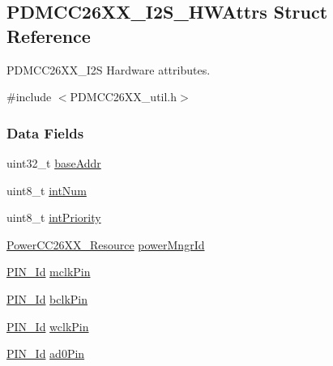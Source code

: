 \subsection{P\+D\+M\+C\+C26\+X\+X\+\_\+\+I2\+S\+\_\+\+H\+W\+Attrs Struct Reference}
\label{struct_p_d_m_c_c26_x_x___i2_s___h_w_attrs}


P\+D\+M\+C\+C26\+X\+X\+\_\+\+I2\+S Hardware attributes.  




{\ttfamily \#include $<$P\+D\+M\+C\+C26\+X\+X\+\_\+util.\+h$>$}

\subsubsection*{Data Fields}
\begin{DoxyCompactItemize}
\item 
uint32\+\_\+t \hyperlink{struct_p_d_m_c_c26_x_x___i2_s___h_w_attrs_af1366b2ec99c0c4b6f99a4f35eb0b1f5}{base\+Addr}
\item 
uint8\+\_\+t \hyperlink{struct_p_d_m_c_c26_x_x___i2_s___h_w_attrs_acaa31ac5c7fdd2274bc81f4aba780301}{int\+Num}
\item 
uint8\+\_\+t \hyperlink{struct_p_d_m_c_c26_x_x___i2_s___h_w_attrs_a3f0d4c4111cb613831d61d0d1b66956c}{int\+Priority}
\item 
\hyperlink{_power_c_c26_x_x_8h_a2e11676879f87f39c099719d717dd04e}{Power\+C\+C26\+X\+X\+\_\+\+Resource} \hyperlink{struct_p_d_m_c_c26_x_x___i2_s___h_w_attrs_a1d03e81015e5838b4ac5156f9f4c66a0}{power\+Mngr\+Id}
\item 
\hyperlink{_p_i_n_8h_a9ae8197f460bb76ea09a84f47d09921f}{P\+I\+N\+\_\+\+Id} \hyperlink{struct_p_d_m_c_c26_x_x___i2_s___h_w_attrs_a8afea4d9f2354f268bd41e8cbd741a2e}{mclk\+Pin}
\item 
\hyperlink{_p_i_n_8h_a9ae8197f460bb76ea09a84f47d09921f}{P\+I\+N\+\_\+\+Id} \hyperlink{struct_p_d_m_c_c26_x_x___i2_s___h_w_attrs_a62627ff326a8ba803bca75d85a04c217}{bclk\+Pin}
\item 
\hyperlink{_p_i_n_8h_a9ae8197f460bb76ea09a84f47d09921f}{P\+I\+N\+\_\+\+Id} \hyperlink{struct_p_d_m_c_c26_x_x___i2_s___h_w_attrs_a521d8c38b647738c7fbb4ef89058da0d}{wclk\+Pin}
\item 
\hyperlink{_p_i_n_8h_a9ae8197f460bb76ea09a84f47d09921f}{P\+I\+N\+\_\+\+Id} \hyperlink{struct_p_d_m_c_c26_x_x___i2_s___h_w_attrs_a42b84a967e7257dda186a3a10b28089a}{ad0\+Pin}
\end{DoxyCompactItemize}


